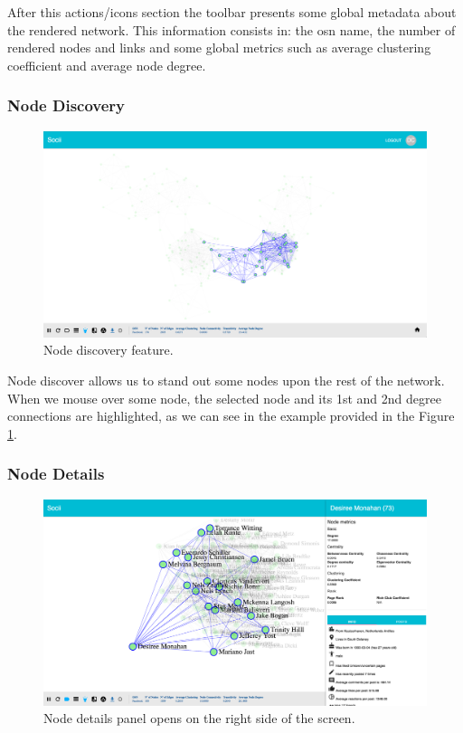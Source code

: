 \indent After this actions/icons section the toolbar presents some global metadata about the rendered network. This information consists in: the \gls{osn} name, the number of rendered nodes and links and some global metrics such as average clustering coefficient and average node degree.

\clearpage
\subsubsection{Node Discovery}

\begin{figure}[h!]
\begin{center}
  \hspace*{-0.8in}
  \includegraphics[width=1.2\textwidth]{img/socii/socii_5.png}
\end{center}
\caption{\label{img:socii_5} Node discovery feature.}
\end{figure}

Node discover allows us to stand out some nodes upon the rest of the network. When we mouse over some node, the selected node and its 1st and 2nd degree connections are highlighted, as we can see in the example provided in the Figure \ref{img:socii_5}.

\subsubsection{Node Details}

\begin{figure}[h!]
\begin{center}
  \hspace*{-0.8in}
  \includegraphics[width=1.2\textwidth]{img/socii/socii_6.png}
\end{center}
\caption{\label{img:socii_6} Node details panel opens on the right side of the screen.}
\end{figure}


